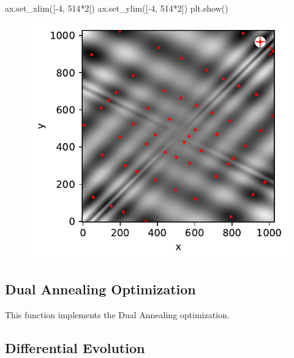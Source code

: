 \documentclass[
  letterpaper,
  DIV=11,
  numbers=noendperiod]{scrreprt}
\newenvironment{Shaded}{\begin{snugshade}}{\end{snugshade}}
\newcommand{\DecValTok}[1]{\textcolor[rgb]{0.68,0.00,0.00}{#1}}
\newcommand{\NormalTok}[1]{\textcolor[rgb]{0.00,0.23,0.31}{#1}}
\newcommand{\OperatorTok}[1]{\textcolor[rgb]{0.37,0.37,0.37}{#1}}
\begin{document}
\begin{Shaded}
\begin{Highlighting}[]
\NormalTok{ax.set\_xlim([}\OperatorTok{{-}}\DecValTok{4}\NormalTok{, }\DecValTok{514}\OperatorTok{*}\DecValTok{2}\NormalTok{])}
\NormalTok{ax.set\_ylim([}\OperatorTok{{-}}\DecValTok{4}\NormalTok{, }\DecValTok{514}\OperatorTok{*}\DecValTok{2}\NormalTok{])}
\NormalTok{plt.show()}
\end{Highlighting}
\end{Shaded}

\begin{figure}[H]

{\centering \includegraphics{003_scipy_optimize_intro_files/figure-pdf/cell-17-output-1.pdf}

}

\end{figure}

\hypertarget{dual-annealing-optimization}{%
\subsection{Dual Annealing
Optimization}\label{dual-annealing-optimization}}

This function implements the Dual Annealing optimization.

\hypertarget{differential-evolution}{%
\subsection{Differential Evolution}\label{differential-evolution}}
\end{document}
